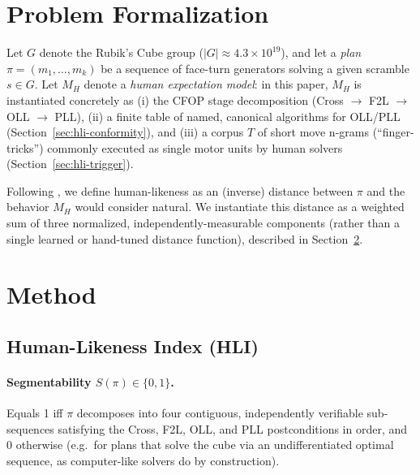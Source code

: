 \documentclass[10pt,conference]{article}
\begin{document}
\section{Problem Formalization}
\label{sec:formalization}

Let $G$ denote the Rubik's Cube group ($|G| \approx 4.3 \times
10^{19}$), and let a \emph{plan} $\pi = (m_1, \ldots, m_k)$ be a
sequence of face-turn generators solving a given scramble $s \in G$.
Let $M_H$ denote a \emph{human expectation model}: in this paper,
$M_H$ is instantiated concretely as (i) the CFOP stage decomposition
(Cross $\to$ F2L $\to$ OLL $\to$ PLL), (ii) a finite table of named,
canonical algorithms for OLL/PLL (Section~\ref{sec:hli-conformity}),
and (iii) a corpus $T$ of short move n-grams (``finger-tricks'')
commonly executed as single motor units by human solvers
(Section~\ref{sec:hli-trigger}).

Following \citet{kulkarni2016}, we define human-likeness as an
(inverse) distance between $\pi$ and the behavior $M_H$ would
consider natural. We instantiate this distance as a weighted sum of
three normalized, independently-measurable components (rather than a
single learned or hand-tuned distance function), described in
Section~\ref{sec:method}.

\section{Method}
\label{sec:method}

\subsection{Human-Likeness Index (HLI)}

\paragraph{Segmentability $S(\pi) \in \{0,1\}$.}
Equals 1 iff $\pi$ decomposes into four contiguous, independently
verifiable sub-sequences satisfying the Cross, F2L, OLL, and PLL
postconditions in order, and 0 otherwise (e.g.\ for plans that solve
the cube via an undifferentiated optimal sequence, as computer-like
solvers do by construction).
\end{document}
